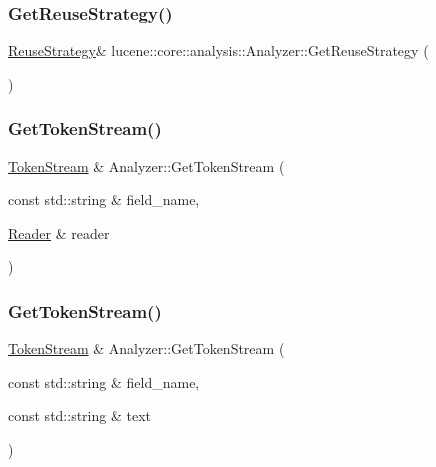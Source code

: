 \subsubsection{\texorpdfstring{Get\+Reuse\+Strategy()}{GetReuseStrategy()}}
{\footnotesize\ttfamily \mbox{\hyperlink{classlucene_1_1core_1_1analysis_1_1Analyzer_1_1ReuseStrategy}{Reuse\+Strategy}}\& lucene\+::core\+::analysis\+::\+Analyzer\+::\+Get\+Reuse\+Strategy (\begin{DoxyParamCaption}{ }\end{DoxyParamCaption})}

\mbox{\label{classlucene_1_1core_1_1analysis_1_1Analyzer_a010cdb318b51c27c46b8cbf5a1cfe20e}} 
\subsubsection{\texorpdfstring{Get\+Token\+Stream()}{GetTokenStream()}\hspace{0.1cm}{\footnotesize\ttfamily [1/2]}}
{\footnotesize\ttfamily \mbox{\hyperlink{classlucene_1_1core_1_1analysis_1_1TokenStream}{Token\+Stream}} \& Analyzer\+::\+Get\+Token\+Stream (\begin{DoxyParamCaption}\item[{const std\+::string \&}]{field\+\_\+name,  }\item[{\mbox{\hyperlink{classlucene_1_1core_1_1analysis_1_1Reader}{Reader}} \&}]{reader }\end{DoxyParamCaption})}

\mbox{\label{classlucene_1_1core_1_1analysis_1_1Analyzer_a385dbda39ff79997402b35ddbb296697}} 
\subsubsection{\texorpdfstring{Get\+Token\+Stream()}{GetTokenStream()}\hspace{0.1cm}{\footnotesize\ttfamily [2/2]}}
{\footnotesize\ttfamily \mbox{\hyperlink{classlucene_1_1core_1_1analysis_1_1TokenStream}{Token\+Stream}} \& Analyzer\+::\+Get\+Token\+Stream (\begin{DoxyParamCaption}\item[{const std\+::string \&}]{field\+\_\+name,  }\item[{const std\+::string \&}]{text }\end{DoxyParamCaption})}

